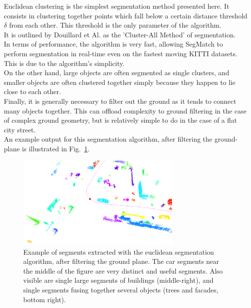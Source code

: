 Euclidean clustering is the simplest segmentation method presented here. It consists in clustering together points which fall below a certain distance threshold $\delta$ from each other. This threshold is the only parameter of the algorithm.\\

It is outlined by Douillard et Al. \cite{douillard2011segmentation} as the 'Cluster-All Method' of segmentation.\\

In terms of performance, the algorithm is very fast, allowing SegMatch to perform segmentation in real-time even on the fastest moving KITTI \cite{KITTI} datasets. This is due to the algorithm's simplicity.\\

On the other hand, large objects are often segmented as single clusters, and smaller objects are often clustered together simply because they happen to lie close to each other.\\

Finally, it is generally necessary to filter out the ground as it tends to connect many objects together. This can offload complexity to ground filtering in the case of complex ground geometry, but is relatively simple to do in the case of a flat city street.\\

An example output for this segmentation algorithm, after filtering the ground-plane is illustrated in Fig.~\ref{fig:euclidean-segments}.

\begin{figure}
  \centering
  \includegraphics[width=3.2in]{images/3_segments.png}
  \caption{Example of segments extracted with the euclidean segmentation algorithm, after filtering the ground plane. The car segments near the middle of the figure are very distinct and useful segments. Also visible are single large segments of buildings (middle-right), and single segments fusing together several objects (trees and facades, bottom right).}
  \label{fig:euclidean-segments}
\end{figure}

